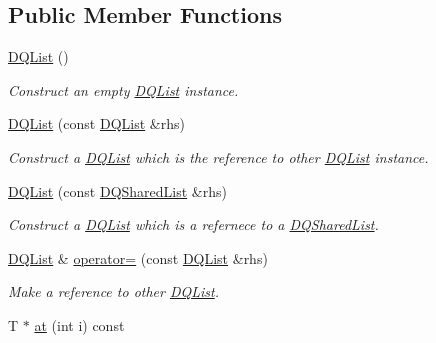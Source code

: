 \subsection*{Public Member Functions}
\begin{DoxyCompactItemize}
\item 
\hypertarget{classDQList_ab496803e58ae8b8435dadc71c6d3aff5}{
\hyperlink{classDQList_ab496803e58ae8b8435dadc71c6d3aff5}{DQList} ()}
\label{classDQList_ab496803e58ae8b8435dadc71c6d3aff5}

\begin{DoxyCompactList}\small\item\em Construct an empty \hyperlink{classDQList}{DQList} instance. \item\end{DoxyCompactList}\item 
\hypertarget{classDQList_a9e5daa59f040ecd03f8591d1b55fc04a}{
\hyperlink{classDQList_a9e5daa59f040ecd03f8591d1b55fc04a}{DQList} (const \hyperlink{classDQList}{DQList} \&rhs)}
\label{classDQList_a9e5daa59f040ecd03f8591d1b55fc04a}

\begin{DoxyCompactList}\small\item\em Construct a \hyperlink{classDQList}{DQList} which is the reference to other \hyperlink{classDQList}{DQList} instance. \item\end{DoxyCompactList}\item 
\hypertarget{classDQList_aec44a735b5cbcc8b81c6ae067380ed59}{
\hyperlink{classDQList_aec44a735b5cbcc8b81c6ae067380ed59}{DQList} (const \hyperlink{classDQSharedList}{DQSharedList} \&rhs)}
\label{classDQList_aec44a735b5cbcc8b81c6ae067380ed59}

\begin{DoxyCompactList}\small\item\em Construct a \hyperlink{classDQList}{DQList} which is a refernece to a \hyperlink{classDQSharedList}{DQSharedList}. \item\end{DoxyCompactList}\item 
\hyperlink{classDQList}{DQList} \& \hyperlink{classDQList_a43c248165c24786d003228b3562335fa}{operator=} (const \hyperlink{classDQList}{DQList} \&rhs)
\begin{DoxyCompactList}\small\item\em Make a reference to other \hyperlink{classDQList}{DQList}. \item\end{DoxyCompactList}\item 
\hypertarget{classDQList_af9d7bc4ba1ee364c81f98dcd0a05e6b0}{
T $\ast$ \hyperlink{classDQList_af9d7bc4ba1ee364c81f98dcd0a05e6b0}{at} (int i) const }
\label{classDQList_af9d7bc4ba1ee364c81f98dcd0a05e6b0}


\end{DoxyCompactItemize}
